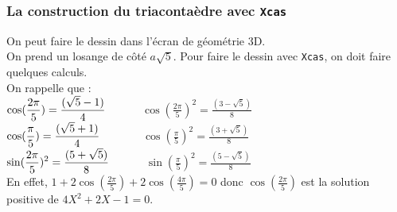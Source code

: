 \documentclass[a4paper,11pt]{book}
\begin{document}
\subsubsection{La construction du triaconta\`edre avec {\tt Xcas}}
On peut faire le dessin dans l'\'ecran de g\'eom\'etrie 3D.\\
On prend un losange de c\^ot\'e $a\sqrt 5$. 
Pour faire le dessin avec {\tt Xcas}, on doit faire quelques calculs.\\
On rappelle que : \\
$\displaystyle\cos(\frac{2\pi}{5})=\frac{(\sqrt 5 -1)}{4}\hspace*{1cm}$ 
$\displaystyle\cos(\frac{2\pi}{5})^2=\frac{(3-\sqrt 5)}{8}$\\
$\displaystyle\cos(\frac{\pi}{5})=\frac{(\sqrt 5 +1)}{4}\hspace*{1.2cm} $ 
$\displaystyle\cos(\frac{\pi}{5})^2=\frac{(3+\sqrt 5)}{8}$\\
$\displaystyle\sin(\frac{2\pi}{5})^2=\frac{(5+\sqrt 5)}{8}\hspace*{1cm} $ 
$\displaystyle\sin(\frac{\pi}{5})^2=\frac{(5-\sqrt 5)}{8}$\\
En effet, $1+2\cos(\frac{2\pi}{5})+2\cos(\frac{4\pi}{5})=0$ donc 
$\cos(\frac{2\pi}{5})$ est la solution positive de $4X^2+2X-1=0$.
\end{document}
